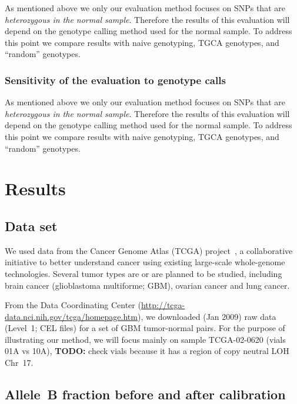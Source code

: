 \documentclass[10pt]{bmc_article}
\newenvironment{bmcformat}{\fussy\setboolean{publ}{true}}{\fussy}
\newenvironment{TODO}{\color{red}\textbf{TODO:}}{}
\begin{document}
\begin{bmcformat}
 
As mentioned above we only our evaluation method focuses on SNPs that are \emph{heterozygous in the normal sample}. Therefore the results of this evaluation will depend on the genotype calling method used for the normal sample. To address this point we compare results with naive genotyping, TGCA genotypes, and ``random'' genotypes.

\subsubsection*{Sensitivity of the evaluation to genotype calls}
As mentioned above we only our evaluation method focuses on SNPs that are \emph{heterozygous in the normal sample}. Therefore the results of this evaluation will depend on the genotype calling method used for the normal sample. To address this point we compare results with naive genotyping, TGCA genotypes, and ``random'' genotypes.

\section*{Results}
\label{secResults}

\subsection*{Data set}
We used data from the  Cancer Genome Atlas (TCGA) project~\cite{CollinsBarker_2007,TCGA_2008c}, a collaborative initiative to better understand cancer using existing large-scale whole-genome technologies.  Several tumor types are or are planned to be studied, including brain cancer (glioblastoma multiforme; GBM), ovarian cancer and lung cancer. 
 
From the Data Coordinating Center (\url{http://tcga-data.nci.nih.gov/tcga/homepage.htm}), we downloaded (Jan 2009) raw data (Level~1; CEL files) for a set of GBM tumor-normal pairs.
For the purpose of illustrating our method, we will focus mainly on sample TCGA-02-0620
(vials 01A vs 10A), \begin{TODO}
  check vials
\end{TODO}
 because it has a region of copy neutral LOH Chr~17.

\subsection*{Allele~B fraction before and after calibration}


\end{bmcformat}
\end{document}
